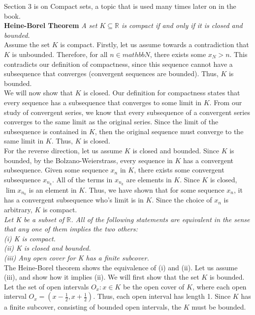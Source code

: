 \documentclass[12pt, letterpaper, twoside]{article}
\begin{document}
Section 3 is on Compact sets, a topic that is used many times later on in the book. \\

\textbf{Heine-Borel Theorem} \textit{ A set $K \subseteq \mathbb{R}$ is compact if and only if it is closed and bounded. } \\

Assume the set $K$ is compact. Firstly, let us assume towards a contradiction that $K$ is unbounded. Therefore, for all $n \in mathbb{N}$, there exists some $x_N > n$. This contradicts our definition of compactness, since this sequence cannot have a subsequence that converges (convergent sequences are bounded). Thus, $K$ is bounded. \\

We will now show that $K$ is closed. Our definition for compactness states that every sequence has a subsequence that converges to some limit in $K$. From our study of convergent series, we know that every subsequence of a convergent series converges to the same limit as the original series. Since the limit of the subsequence is contained in $K$, then the original sequence must converge to the same limit in $K$. Thus, $K$ is closed. \\

For the reverse direction, let us assume $K$ is closed and bounded. Since $K$ is bounded, by the Bolzano-Weierstrass, every sequence in $K$ has a convergent subsequence. Given some sequence $x_n$ in $K$, there exists some convergent subsequence $x_{n_k}$. All of the terms in $x_{n_k}$ are elements in $K$. Since $K$ is closed, $\lim x_{n_k}$ is an element in $K$. Thus, we have shown that for some sequence $x_n$, it has a convergent subsequence who's limit is in $K$. Since the choice of $x_n$ is arbitrary, $K$ is compact. \\

\textit{Let K be a subset of $\mathbb{R}$. All of the following statements are equivalent in the sense that any one of them implies the two others:}\\

\textit{(i) K is compact.} \\

\textit{(ii) K is closed and bounded. }\\

\textit{(iii) Any open cover for K has a finite subcover.} \\

The Heine-Borel theorem shows the equivalence of (i) and (ii). Let us assume (iii), and show how it implies (ii). We will first show that the set $K$ is bounded. Let the set of open intervals ${O_x \colon x \in K}$ be the open cover of $K$, where each open interval $O_x = (x - \frac{1}{2}, x + \frac{1}{2})$. Thus, each open interval has length 1. Since $K$ has a finite subcover, consisting of bounded open intervals, the $K$ must be bounded. \\ 
\end{document}
